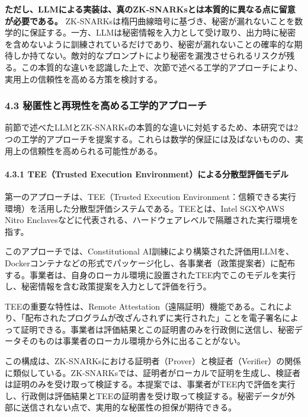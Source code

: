 \textbf{ただし、LLMによる実装は、真のZK-SNARKsとは本質的に異なる点に留意が必要である。} ZK-SNARKsは楕円曲線暗号に基づき、秘密が漏れないことを数学的に保証する。一方、LLMは秘密情報を入力として受け取り、出力時に秘密を含めないように訓練されているだけであり、秘密が漏れないことの確率的な期待しか持てない。敵対的なプロンプトにより秘密を漏洩させられるリスクが残る。この本質的な違いを認識した上で、次節で述べる工学的アプローチにより、実用上の信頼性を高める方策を検討する。

\subsubsection{4.3 秘匿性と再現性を高める工学的アプローチ}\label{ux79d8ux533fux6027ux3068ux518dux73feux6027ux3092ux9ad8ux3081ux308bux5de5ux5b66ux7684ux30a2ux30d7ux30edux30fcux30c1}

前節で述べたLLMとZK-SNARKsの本質的な違いに対処するため、本研究では2つの工学的アプローチを提案する。これらは数学的保証には及ばないものの、実用上の信頼性を高められる可能性がある。

\paragraph{4.3.1 TEE（Trusted Execution Environment）による分散型評価モデル}\label{teetrusted-execution-environmentux306bux3088ux308bux5206ux6563ux578bux8a55ux4fa1ux30e2ux30c7ux30eb}

第一のアプローチは、TEE（Trusted Execution Environment：信頼できる実行環境）を活用した分散型評価システムである。TEEとは、Intel SGXやAWS Nitro Enclavesなどに代表される、ハードウェアレベルで隔離された実行環境を指す。

このアプローチでは、Constitutional AI訓練により構築された評価用LLMを、Dockerコンテナなどの形式でパッケージ化し、各事業者（政策提案者）に配布する。事業者は、自身のローカル環境に設置されたTEE内でこのモデルを実行し、秘密情報を含む政策提案を入力として評価を行う。

TEEの重要な特性は、Remote Attestation（遠隔証明）機能である。これにより、「配布されたプログラムが改ざんされずに実行された」ことを電子署名によって証明できる。事業者は評価結果とこの証明書のみを行政側に送信し、秘密データそのものは事業者のローカル環境から外に出ることがない。

この構成は、ZK-SNARKsにおける証明者（Prover）と検証者（Verifier）の関係に類似している。ZK-SNARKsでは、証明者がローカルで証明を生成し、検証者は証明のみを受け取って検証する。本提案では、事業者がTEE内で評価を実行し、行政側は評価結果とTEEの証明書を受け取って検証する。秘密データが外部に送信されない点で、実用的な秘匿性の担保が期待できる。

